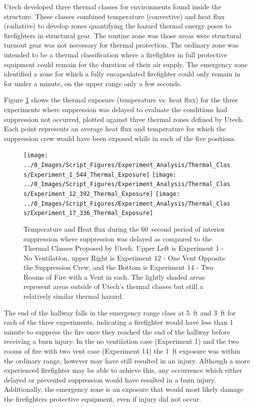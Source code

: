 \documentclass[12pt,oneside]{book}
\begin{document}
Utech developed three thermal classes for environments found inside the structure. These classes combined temperature (convective) and heat flux (radiative) to develop zones quantifying the hazard thermal energy poses to firefighters in structural gear. The routine zone was those areas were structural turnout gear was not necessary for thermal protection. The ordinary zone was intended to be a thermal classification where a firefighter in full protective equipment could remain for the duration of their air supply. The emergency zone identified a zone for which a fully encapsulated firefighter could only remain in for under a minute, on the upper range only a few seconds.  

Figure \ref{fig:Thermal_Classes_Approach_Delayed_Suppression} shows the thermal exposure (temperature vs. heat flux) for the three experiments where suppression was delayed to evaluate the conditions had suppression not occurred, plotted against three thermal zones defined by Utech. Each point represents an average heat flux and temperature for which the suppression crew would have been exposed while in each of the five positions. 

\begin{figure}[H]
\centering
\texttt{[image: ../0\_Images/Script\_Figures/Experiment\_Analysis/Thermal\_Class/Experiment\_1\_544\_Thermal\_Exposure]} 
\texttt{[image: ../0\_Images/Script\_Figures/Experiment\_Analysis/Thermal\_Class/Experiment\_12\_392\_Thermal\_Exposure]}
\texttt{[image: ../0\_Images/Script\_Figures/Experiment\_Analysis/Thermal\_Class/Experiment\_17\_336\_Thermal\_Exposure]} 
\caption[Delayed Suppression Hallway Thermal Class Comparison]{Temperature and Heat flux during the 60~second period of interior suppression where suppression was delayed as compared to the Thermal Classes Proposed by Utech. Upper Left is Experiment 1 - No Ventilation, upper Right is Experiment 12 - One Vent Opposite the Suppression Crew, and the Bottom is Experiment 14 - Two Rooms of Fire with a Vent in each. The lightly shaded areas represent areas outside of Utech's thermal classes but still a relatively similar thermal hazard.}
\label{fig:Thermal_Classes_Approach_Delayed_Suppression}
\end{figure}

The end of the hallway falls in the emergency range class at 5~ft and 3~ft for each of the three experiments, indicating a firefighter would have less than 1 minute to suppress the fire once they reached the end of the hallway before receiving a burn injury. In the no ventilation case (Experiment 1) and the two rooms of fire with two vent case (Experiment 14) the 1~ft exposure was within the ordinary range, however may have still resulted in an injury. Although a more experienced firefighter may be able to achieve this, any occurrence which either delayed or prevented suppression would have resulted in a burn injury. Additionally, the emergency zone is an exposure that would most likely damage the firefighters protective equipment, even if injury did not occur. 
\end{document}
